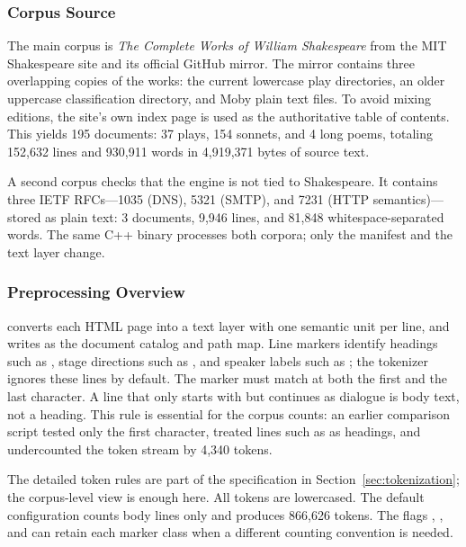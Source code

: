 \subsubsection{Corpus Source}
\label{sec:corpus}

The main corpus is \emph{The Complete Works of William Shakespeare} from the
MIT Shakespeare site \cite{shakespeare} and its official GitHub mirror. The
mirror contains three overlapping copies of the works: the current lowercase
play directories, an older uppercase classification directory, and Moby plain
text files. To avoid mixing editions, the site's own index page is used as the
authoritative table of contents. This yields 195 documents: 37 plays, 154
sonnets, and 4 long poems, totaling 152,632 lines and 930,911 words in
4,919,371 bytes of source text.

A second corpus checks that the engine is not tied to Shakespeare. It contains
three IETF RFCs---1035 (DNS), 5321 (SMTP), and 7231 (HTTP semantics)---stored
as plain text: 3 documents, 9,946 lines, and 81,848 whitespace-separated words.
The same C++ binary processes both corpora; only the manifest and the text
layer change.

\subsubsection{Preprocessing Overview}
\label{sec:preprocess}

 converts each HTML page into a text layer with one
semantic unit per line, and writes  as the document catalog
and path map. Line markers identify headings such as \code{[ACT I]}, stage
directions such as , and speaker labels such as
; the tokenizer ignores these lines by default. The marker
must match at both the first and the last character. A line that only starts
with \code{[} but continues as dialogue is body text, not a heading. This rule
is essential for the corpus counts: an earlier comparison script tested only
the first character, treated lines such as  as headings, and undercounted the token stream by 4,340 tokens.

The detailed token rules are part of the specification in
Section~\ref{sec:tokenization}; the corpus-level view is enough here. All
tokens are lowercased. The default configuration counts body lines only and
produces 866,626 tokens. The flags ,
, and  can retain each marker class
when a different counting convention is needed.

